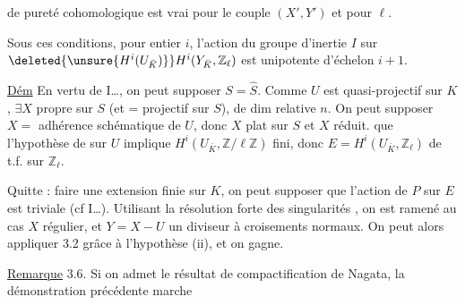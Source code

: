 
de pureté cohomologique est vrai pour le couple $(X',Y')$ et pour $\ell$.

Sous ces conditions,  pour  entier $i$, l'action du groupe d'inertie $I$ sur $\deleted{\unsure{H^i(U_{\bar K})}}H^i(Y_{\bar K},\mathbb Z_\ell)$ est  unipotente d'échelon $i+1$.

\uline{Dém} En vertu de I\ldots, on peut supposer $S=\hat S$.  Comme $U$ est quasi-projectif sur $K$,   $\exists X$  propre sur $S$ (et = projectif sur $S$),  de dim relative $n$. On peut supposer $X=$ adhérence schématique de $U$, donc $X$ plat sur $S$ et $X$ réduit.   que l'hypothèse de   sur $U$ implique $H^i(U_{\bar K},\mathbb Z/\ell\mathbb Z)$ fini, donc $E=H^i(U_{\bar K},\mathbb Z_\ell)$ de t.f. sur $\mathbb Z_\ell$.

Quitte : faire une extension finie  sur $K$, on peut supposer que l'action de $P$ sur $E$ est triviale (cf I\ldots). Utilisant la résolution  forte des singularités , on est ramené au cas $X$ régulier, et $Y=X-U$ un diviseur à croisements normaux. On peut alors appliquer 3.2 grâce à l'hypothèse (ii), et on gagne.

\uline{Remarque} 3.6. Si on admet le résultat de compactification de Nagata, la démonstration précédente marche
